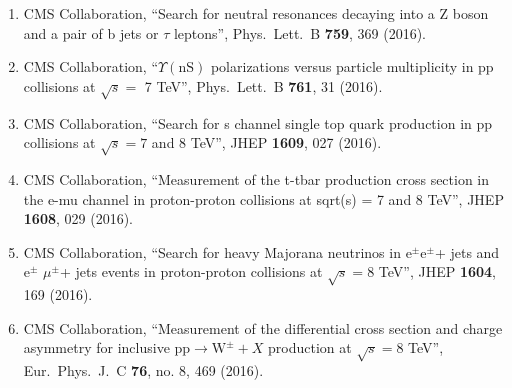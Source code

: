 \begin{enumerate}
\item CMS Collaboration, ``Search for neutral resonances decaying into a Z boson and a pair of b jets or $\tau$ leptons'', Phys.\ Lett.\ B {\bf 759}, 369 (2016).

\item CMS Collaboration, ``$\Upsilon(\mathrm{nS})$ polarizations versus particle multiplicity in pp collisions at $\sqrt{s} =$ 7 TeV'', Phys.\ Lett.\ B {\bf 761}, 31 (2016).

\item CMS Collaboration, ``Search for s channel single top quark production in pp collisions at $ \sqrt{s}=7 $ and 8 TeV'', JHEP {\bf 1609}, 027 (2016).

\item CMS Collaboration, ``Measurement of the t-tbar production cross section in the e-mu channel in proton-proton collisions at sqrt(s) = 7 and 8 TeV'', JHEP {\bf 1608}, 029 (2016).

\item CMS Collaboration, ``Search for heavy Majorana neutrinos in e$^{±}$e$^{±}$+ jets and e$^{±}$ $\mu^{±}$+ jets events in proton-proton collisions at $ \sqrt{s}=8 $ TeV'', JHEP {\bf 1604}, 169 (2016).

\item CMS Collaboration, ``Measurement of the differential cross section and charge asymmetry for inclusive $\mathrm {p}\mathrm {p}\rightarrow \mathrm {W}^{\pm }+X$ production at ${\sqrt{s}} = 8$ TeV'', Eur.\ Phys.\ J.\ C {\bf 76}, no. 8, 469 (2016).


\end{enumerate}
